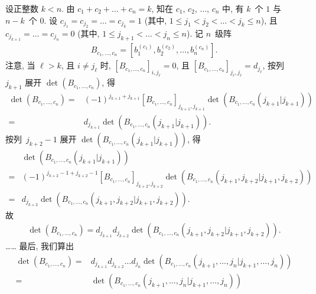 \documentclass[../libro.tex]{subfiles}
\begin{document}
\begin{example}
    设正整数 \(k < n\).
    由 \(c_1 + c_2 + \dots + c_n = k\),
    知在 \(c_1\), \(c_2\), \(\dots\), \(c_n\)
    中, 有 \(k\)~个 \(1\) 与 \(n-k\)~个 \(0\).
    设 \(c_{j_1} = c_{j_2} = \dots = c_{j_k} = 1\)
    (其中, \(1 \leq j_1 < j_2 < \dots < j_k \leq n\)),
    且 \(c_{j_{k+1}} = \dots = c_{j_n} = 0\)
    (其中, \(1 \leq j_{k+1} < \dots < j_n \leq n\)).
    记 \(n\)~级阵
    \begin{align*}
        B_{c_1,\dots,c_n}
        = [b_1^{(c_1)}, b_2^{(c_2)}, \dots, b_n^{(c_n)}].
    \end{align*}
    注意, 当 \(\ell > k\),
    且 \(i \neq j_\ell\) 时,
    \([B_{c_1,\dots,c_n}]_{i,j_\ell} = 0\),
    且 \([B_{c_1,\dots,c_n}]_{j_\ell,j_\ell} = d_{j_\ell}\),
    按列~\(j_{k+1}\) 展开 \(\det {(B_{c_1,\dots,c_n})}\),
    得
    \begin{align*}
        \det {(B_{c_1,\dots,c_n})}
        = {} & (-1)^{j_{k+1}+j_{k+1}}
        [B_{c_1,\dots,c_n}]_{j_{k+1},j_{k+1}}
        \det {(B_{c_1,\dots,c_n}(j_{k+1}|j_{k+1}))}
        \\
        = {} &
        d_{j_{k+1}} \det {(B_{c_1,\dots,c_n}(j_{k+1}|j_{k+1}))}.
    \end{align*}
    按列~\(j_{k+2}-1\) 展开
    \(\det {(B_{c_1,\dots,c_n}(j_{k+1}|j_{k+1}))}\),
    得
    \begin{align*}
        &
        \det {(B_{c_1,\dots,c_n}(j_{k+1}|j_{k+1}))}
        \\
        = {} & (-1)^{j_{k+2}-1+j_{k+2}-1}
        [B_{c_1,\dots,c_n}]_{j_{k+2},j_{k+2}}
        \det {(B_{c_1,\dots,c_n}
        ({j_{k+1},j_{k+2}}|{j_{k+1},j_{k+2}}))}
        \\
        = {} &
        d_{j_{k+2}}
        \det {(B_{c_1,\dots,c_n}
        ({j_{k+1},j_{k+2}}|{j_{k+1},j_{k+2}}))}.
    \end{align*}
    故
    \begin{align*}
        \det {(B_{c_1,\dots,c_n})}
        = d_{j_{k+1}} d_{j_{k+2}}
        \det {(B_{c_1,\dots,c_n}
        ({j_{k+1},j_{k+2}}|{j_{k+1},j_{k+2}}))}.
    \end{align*}
    ……
    最后, 我们算出
    \begin{align*}
        \det {(B_{c_1,\dots,c_n})}
        = {} &
        d_{j_{k+1}} d_{j_{k+2}} \dots d_{j_n}
        \det {(B_{c_1,\dots,c_n}
        ({j_{k+1},\dots,j_n}|{j_{k+1},\dots,j_n}))}
        \\
        = {} &
        \det {(B_{c_1,\dots,c_n}
        ({j_{k+1},\dots,j_n}|{j_{k+1},\dots,j_n}))}

\end{align*}
\end{example}
\end{document}
